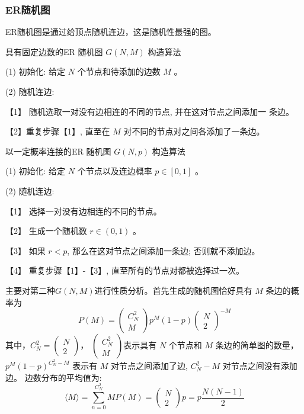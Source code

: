 \subsubsection*{ER随机图}
ER随机图是通过给顶点随机连边，这是随机性最强的图。\par
\noindent 具有固定边数的ER 随机图 $G(N, M)$ 构造算法\par
\noindent(1) 初始化: 给定 $N$ 个节点和待添加的边数 $M$ 。\par
\noindent(2) 随机连边:\par
【1】 随机选取一对没有边相连的不同的节点, 并在这对节点之间添加一 条边。\par
【2】重复步骤【1】, 直至在 $M$ 对不同的节点对之间各添加了一条边。\par
\noindent 以一定概率连接的ER 随机图 $G(N, p)$ 构造算法\par
\noindent(1) 初始化: 给定 $N$ 个节点以及连边概率 $p \in[0,1]$ 。\par
\noindent(2) 随机连边:\par
【1】 选择一对没有边相连的不同的节点。\par
【2】 生成一个随机数 $r \in(0,1)$ 。\par
【3】 如果 $r<p$, 那么在这对节点之间添加一条边; 否则就不添加边。\par
【4】 重复步骤【1】-【3】, 直至所有的节点对都被选择过一次。\par
主要对第二种$G(N, M)$进行性质分析。首先生成的随机图恰好具有 $M$ 条边的概率为
\begin{equation}
    P(M)=\left(\begin{array}{c}
    C^2_N \\
    M
    \end{array}\right) p^M(1-p)\left(\begin{array}{c}
    N \\
    2
    \end{array}\right)^{-M}
\end{equation}
其中，$C^2_N=\left(\begin{array}{c}
    N \\
    2
    \end{array}\right)$，
$\left(\begin{array}{c}
    C^2_N \\
    M
    \end{array}\right)$表示具有 $N$ 个节点和 $M$ 条边的简单图的数量，
    $p^M(1-p)^{C^2_N-M}$ 
表示有 $M$ 对节点之间添加了边, $C^2_N-M$ 对节点之间没有添加边。
边数分布的平均值为:
\begin{equation}
    \langle M\rangle=\sum_{n=0}^{C^2_N} M P(M)=\left(\begin{array}{l}
    N \\
    2
    \end{array}\right) p=p \frac{N(N-1)}{2}
    \end{equation}
